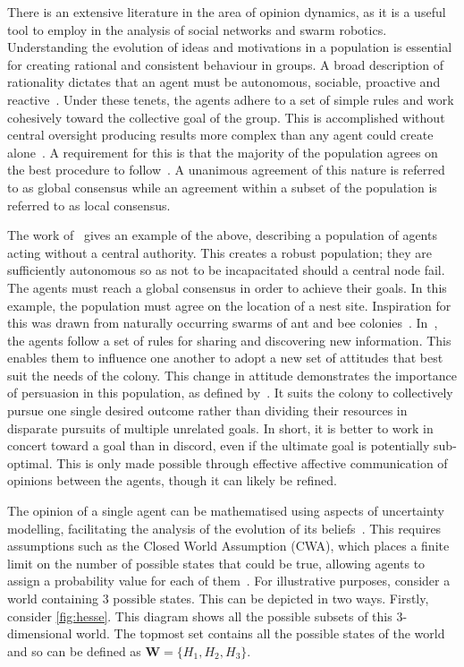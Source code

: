 There is an extensive literature in the area of opinion dynamics, as it is a useful tool to employ in the analysis of social networks and swarm robotics. Understanding the evolution of ideas and motivations in a population is essential for creating rational and consistent behaviour in groups. A broad description of rationality dictates that an agent must be autonomous, sociable, proactive and reactive~\cite{Genesereth1994SoftwareAgents, Castelfranchi1995GuaranteesArchitecture}. Under these tenets, the agents adhere to a set of simple rules and work cohesively toward the collective goal of the group. This is accomplished without central oversight producing results more complex than any agent could create alone~\cite{Rawls1971AJustice}. A requirement for this is that the majority of the population agrees on the best procedure to follow~\cite{Baronchelli2018ThePrimer}. A unanimous agreement of this nature is referred to as global consensus while an agreement within a subset of the population is referred to as local consensus.


The work of~\cite{Parker2009CooperativeProblem} gives an example of the above, describing a population of agents acting without a central authority. This creates a robust population; they are sufficiently autonomous so as not to be incapacitated should a central node fail. The agents must reach a global consensus in order to achieve their goals. In this example, the population must agree on the location of a nest site. Inspiration for this was drawn from naturally occurring swarms of ant and bee colonies~\cite{Pratt2005BehavioralCurvispinosus, List2009IndependenceSwarms}. In~\cite{Parker2009CooperativeProblem}, the agents follow a set of rules for sharing and discovering new information. This enables them to influence one another to adopt a new set of attitudes that best suit the needs of the colony. This change in attitude demonstrates the importance of persuasion in this population, as defined by~\cite{Petty1986CommunicationChange}. It suits the colony to collectively pursue one single desired outcome rather than dividing their resources in disparate pursuits of multiple unrelated goals. In short, it is better to work in concert toward a goal than in discord, even if the ultimate goal is potentially sub-optimal. This is only made possible through effective affective communication of opinions between the agents, though it can likely be refined. 

The opinion of a single agent can be mathematised using aspects of uncertainty modelling, facilitating the analysis of the evolution of its beliefs~\cite{Wooldridge1995IntelligentPractice}. This requires assumptions such as the Closed World Assumption (CWA), which places a finite limit on the number of possible states that could be true, allowing agents to assign a probability value for each of them~\cite{Jsang2001APROBABILITIES}. For illustrative purposes, consider a world containing $3$ possible states. This can be depicted in two ways. Firstly, consider \cref{fig:hesse}. This diagram shows all the possible subsets of this $3$-dimensional world. The topmost set contains all the possible states of the world and so can be defined as $\mathbf{W} = \{ H_1, H_2, H_3\}$. 

